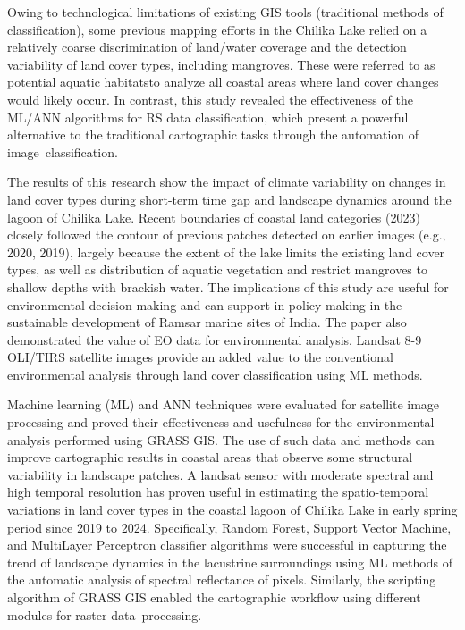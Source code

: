 \documentclass[jmse,article,accept,pdftex,oneauthor]{Definitions/mdpi}
\begin{document}
Owing to technological limitations of existing GIS tools (traditional methods of classification), some previous mapping efforts in the Chilika Lake relied on a relatively coarse discrimination of land/water coverage and the  detection variability of land cover types, including mangroves. These were referred to as potential aquatic habitatsto analyze all coastal areas where land cover changes would likely occur. In contrast, this study revealed the effectiveness of the ML/ANN algorithms for RS data classification, which present a powerful alternative to the traditional cartographic tasks through the  automation of image~classification. 

The results of this research show the impact of climate variability on changes in land cover types during short-term time gap and landscape dynamics around the lagoon of   Chilika Lake. Recent boundaries of coastal land categories (2023) closely followed the contour of previous patches detected on earlier images (e.g., 2020, 2019), largely because the extent of the lake limits the existing land cover types, as well as distribution of aquatic vegetation  and restrict mangroves to shallow depths with brackish water. The implications of this study are useful for environmental decision-making  and can support in policy-making in the sustainable development of Ramsar marine sites of India. The paper also demonstrated the value of EO data for environmental analysis. Landsat 8-9 OLI/TIRS satellite images provide an added value to the conventional environmental analysis through land cover classification using ML methods. 

Machine learning (ML) and ANN techniques were evaluated for satellite image processing and proved their effectiveness and usefulness for the environmental analysis performed using GRASS GIS. The use of such data and methods can improve cartographic results in coastal areas that observe some structural variability in landscape patches. A landsat sensor with moderate spectral and high temporal resolution has   proven useful in estimating the spatio-temporal variations in land cover types in the coastal lagoon of Chilika Lake in early spring period since 2019 to 2024. Specifically, Random Forest, Support Vector Machine, and MultiLayer Perceptron classifier algorithms were successful in capturing the trend of landscape dynamics in the lacustrine surroundings using ML methods of the automatic analysis of spectral reflectance of pixels. Similarly, the scripting algorithm of GRASS GIS enabled the cartographic workflow using different modules for raster data~processing. 
\end{document}
